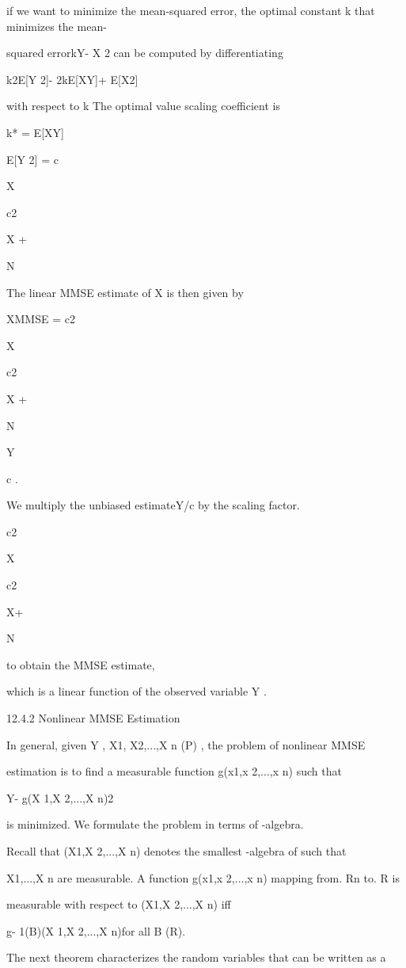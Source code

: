 if we want to minimize the mean-squared error, the optimal constant k that minimizes the mean-

squared errorkY- X 2 can be computed by differentiating

k2E[Y 2]- 2kE[XY]+ E[X2]

with respect to k The optimal value scaling coefficient is

k* = E[XY]

E[Y 2] = c

X

c2

X +

N

The linear MMSE estimate of X is then given by

XMMSE = c2

X

c2

X +

N

\cdot Y

c .

We multiply the unbiased estimateY/c by the scaling factor.

c2

X

c2

X+

N

to obtain the MMSE estimate,

which is a linear function of the observed variable Y .

12.4.2 Nonlinear MMSE Estimation

In general, given Y , X1, X2,...,X n (P) , the problem of nonlinear MMSE

estimation is to find a measurable function g(x1,x 2,...,x n) such that

Y- g(X 1,X 2,...,X n)2

is minimized. We formulate the problem in terms of \sigma-algebra.

Recall that \sigma(X1,X 2,...,X n) denotes the smallest \sigma-algebra of  such that

X1,...,X n are measurable. A function g(x1,x 2,...,x n) mapping from. Rn to. R is

measurable with respect to \sigma(X1,X 2,...,X n) iff

g- 1(B)\in \sigma(X 1,X 2,...,X n)for all B \in {} (R).

The next theorem characterizes the random variables that can be written as a

